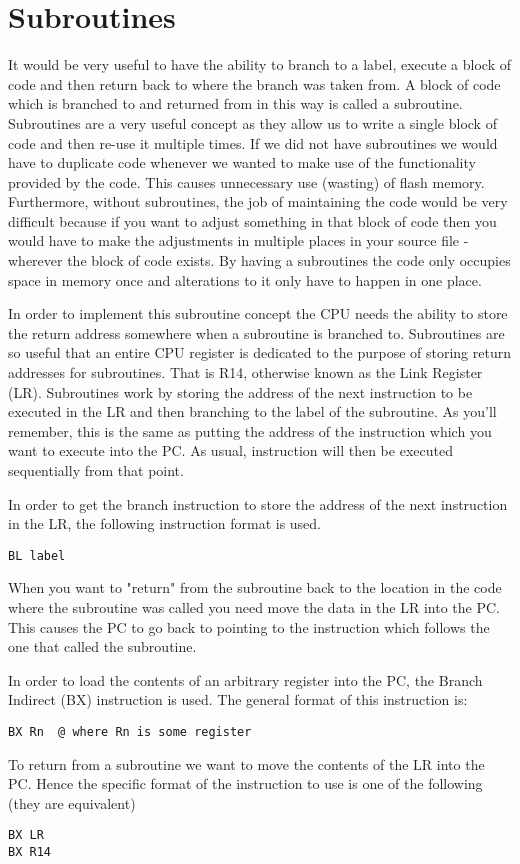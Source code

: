 \chapter{Subroutines}
It would be very useful to have the ability to branch to a label, execute a block of code and then return back to where the branch was taken from. A block of code which is branched to and returned from in this way is called a subroutine.
Subroutines are a very useful concept as they allow us to write a single block of code and then re-use it multiple times. 
If we did not have subroutines we would have to duplicate code whenever we wanted to make use of the functionality provided by the code.
This causes unnecessary use (wasting) of flash memory.
Furthermore, without subroutines, the job of maintaining the code would be very difficult because if you want to adjust something in that block of code then you would have to make the adjustments in multiple places in your source file - wherever the block of code exists.
By having a subroutines the code only occupies space in memory once and alterations to it only have to happen in one place.

In order to implement this subroutine concept the CPU needs the ability to store the return address somewhere when a subroutine is branched to. 
Subroutines are so useful that an entire CPU register is dedicated to the purpose of storing return addresses for subroutines. That is R14, otherwise known as the Link Register (LR).
Subroutines work by storing the address of the next instruction to be executed in the LR and then branching to the label of the subroutine.
As you'll remember, this is the same as putting the address of the instruction which you want to execute into the PC. As usual, instruction will then be executed sequentially from that point.

In order to get the branch instruction to store the address of the next instruction in the LR, the following instruction format is used.
\begin{lstlisting}[fontadjust=true,frame=trBL]
BL label

\end{lstlisting}

When you want to "return" from the subroutine back to the location in the code where the subroutine was called you need move the data in the LR into the PC. This causes the PC to go back to pointing to the instruction which follows the one that called the subroutine. 

In order to load the contents of an arbitrary register into the PC, the Branch Indirect (BX) instruction is used.
The general format of this instruction is:
\begin{lstlisting}[fontadjust=true,frame=trBL]
BX Rn  @ where Rn is some register
\end{lstlisting}

To return from a subroutine we want to move the contents of the LR into the PC. Hence the specific format of the instruction to use is one of the following (they are equivalent) 
\begin{lstlisting}[fontadjust=true,frame=trBL]
BX LR
BX R14
\end{lstlisting}
